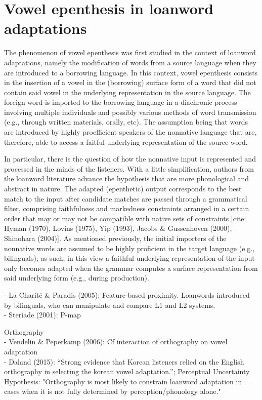 \section{Vowel epenthesis in loanword adaptations}
The phenomenon of vowel epenthesis was first studied in the context of loanword adaptations, namely the modification of words from a source language when they are introduced to a borrowing language. In this context, vowel epenthesis consists in the insertion of a vowel in the (borrowing) surface form of a word that did not contain said vowel in the underlying representation in the source language.  
The foreign word is imported to the borrowing language in a diachronic process involving multiple individuals and possibly various methods of word transmission (e.g., through written materials, orally, etc). The assumption being that words are introduced by highly proefficient speakers of the nonnative language that are, therefore, able to access a faitful underlying representation of the source word. 

In particular, there is the question of how the nonnative input is represented and processed in the minds of the listeners. With a little simplification, authors from the loanword literature advance the hypothesis that are more phonological and abstract in nature. The adapted (epenthetic) output corresponds to the best match to the input after candidate matches are passed through a grammatical filter, comprising faithfulness and markedness constraints arranged in a certain order that may or may not be compatible with native sets of constraints [cite: Hyman (1970), Lovins (1975), Yip (1993), Jacobs \& Gussenhoven (2000), Shinohara (2004)]. As mentioned previously, the initial importers of the nonnative words are assumed to be highly proficient in the target language (e.g., bilinguals); as such, in this view a faithful underlying representation of the input only becomes adapted when the grammar computes a surface representation from said underlying form (e.g., during production).   

    - La Charité \& Paradis (2005): Feature-based proximity. Loanwords introduced by bilinguals, who can manipulate and compare L1 and L2 systems. \\
    - Steriade (2001): P-map
      \item Orthography \\
    - Vendelin \& Peperkamp (2006): Cf interaction of orthography on vowel adaptation \\ 
    - Daland (2015): ``Strong evidence that Korean listeners relied on the English orthography in selecting the korean vowel adaptation.''; Perceptual Uncertainty Hypothesis: "Orthography is most likely to constrain loanword adaptation in cases when it is not fully determined by perception/phonology alone."

